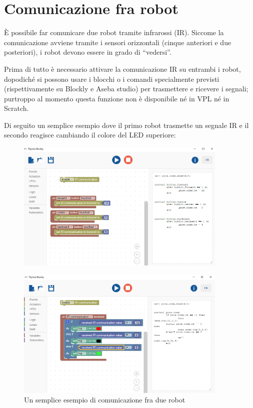 \documentclass[12pt]{article}
\begin{document}
	
\section{Comunicazione fra robot}\label{network}

	È possibile far comunicare due robot tramite infrarossi (IR). Siccome la comunicazione avviene tramite i sensori orizzontali (cinque anteriori e due posteriori), i robot devono essere in grado di ``vedersi''.
	
	Prima di tutto è necessario attivare la comunicazione IR su entrambi i robot, dopodiché si possono usare i blocchi o i comandi specialmente previsti (rispettivamente su Blockly e Aseba studio) per trasmettere e ricevere i segnali; purtroppo al momento questa funzione non è disponibile né in VPL né in Scratch.
	
	Di seguito un semplice esempio dove il primo robot trasmette un segnale IR e il secondo reagisce cambiando il colore del LED superiore: 
	
	\begin{figure}[H]
		\centering
		\includegraphics[width=0.9\textwidth]{img/blocklyIR1.png}
		\label{blocklyIR1}
	\end{figure}
		
	\begin{figure}[H]
		\centering
		\includegraphics[width=0.9\textwidth]{img/blocklyIR2.png}
		\caption{Un semplice esempio di comunicazione fra due robot}
		\label{blocklyIR2}
	\end{figure}
	
\end{document}
